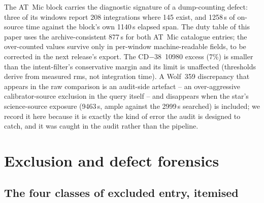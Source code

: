 \documentclass{openjournal}
\begin{document}
The AT~Mic block carries the diagnostic signature of a dump-counting
defect: three of its windows report 208 integrations where 145 exist,
and 1258\,s of on-source time against the block's own 1140\,s elapsed
span. The duty table of this paper uses the archive-consistent 877\,s
for both AT~Mic catalogue entries; the over-counted values survive
only in per-window machine-readable fields, to be corrected in the
next release's export. The CD$-$38~10980 excess (7\%) is smaller than
the intent-filter's conservative margin and its limit is unaffected
(thresholds derive from measured rms, not integration time). A
Wolf~359 discrepancy that appears in the raw comparison is an
audit-side artefact -- an over-aggressive calibrator-source exclusion
in the query itself -- and disappears when the star's science-source
exposure (9463\,s, ample against the 2999\,s searched) is included;
we record it here because it is exactly the kind of error the audit
is designed to catch, and it was caught in the audit rather than the
pipeline.

\section{Exclusion and defect forensics}
\label{app:exclusions}

\subsection*{The four classes of excluded entry, itemised}
\end{document}
